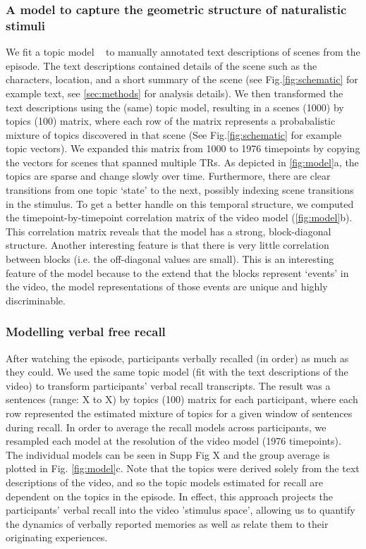 \documentclass{article}
\begin{document}
{\subsubsection{A model to capture the geometric structure of naturalistic stimuli}
We fit a topic model ~\cite{Blei03} to manually annotated text descriptions of scenes from the episode. The text descriptions contained details of the scene such as the characters, location, and a short summary of the scene (see Fig.\ref{fig:schematic} for example text, see \ref{sec:methods} for analysis details). We then transformed the text descriptions using the (same) topic model, resulting in a scenes (1000) by topics (100) matrix, where each row of the matrix represents a probabalistic mixture of topics discovered in that scene (See Fig.\ref{fig:schematic} for example topic vectors). We expanded this matrix from 1000 to 1976 timepoints by copying the vectors for scenes that spanned multiple TRs. As depicted in \ref{fig:model}a, the topics are sparse and change slowly over time. Furthermore, there are clear transitions from one topic `state' to the next, possibly indexing scene transitions in the stimulus.  To get a better handle on this temporal structure, we computed the timepoint-by-timepoint correlation matrix of the video model (\ref{fig:model}b).  This correlation matrix reveals that the model has a strong, block-diagonal structure.  Another interesting feature is that there is very little correlation between blocks (i.e. the off-diagonal values are small). This is an interesting feature of the model because to the extend that the blocks represent `events' in the video, the model representations of those events are unique and highly discriminable.

\subsubsection{Modelling verbal free recall}
After watching the episode, participants verbally recalled (in order) as much as they could.  We used the same topic model (fit with the text descriptions of the video) to transform participants' verbal recall transcripts. The result was a sentences (range: X to X) by topics (100) matrix for each participant, where each row represented the estimated mixture of topics for a given window of sentences during recall. In order to average the recall models across participants, we resampled each model at the resolution of the video model (1976 timepoints). The individual models can be seen in Supp Fig X and the group average is plotted in Fig. \ref{fig:model}c. Note that the topics were derived solely from the text descriptions of the video, and so the topic models estimated for recall are dependent on the topics in the episode. In effect, this approach projects the participants' verbal recall into the video 'stimulus space', allowing us to quantify the dynamics of verbally reported memories as well as relate them to their originating experiences.

}
\end{document}
